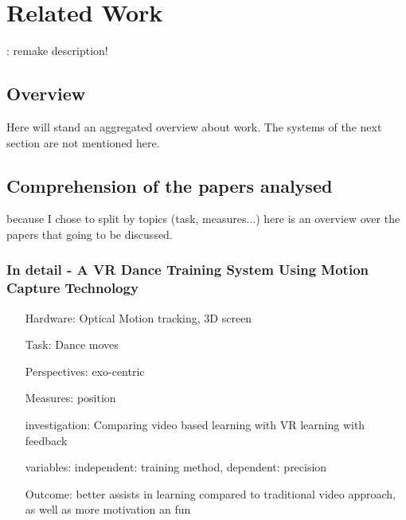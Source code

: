 \chapter{Related Work}
\todo: remake description! \\ %

\section{Overview}
Here will stand an aggregated overview about work. The systems of the next section are not mentioned here.
\section{Comprehension of the papers analysed}
because I chose to split by topics (task, measures...) here is an overview over the papers that going to be discussed.
\subsection{In detail - A VR Dance Training System Using Motion Capture Technology}
\begin{itemize}
	\item[Hardware:] Optical Motion tracking, 3D screen
	\item[Task:] Dance moves
	\item[Perspectives:] exo-centric
	\item[Measures:] position
	\item[investigation:] Comparing video based learning with VR learning with feedback
	\item[variables:] independent: training method, dependent: precision
	\item[Outcome:] better assists in learning compared to traditional video approach, as well as more motivation an fun
\end{itemize}

